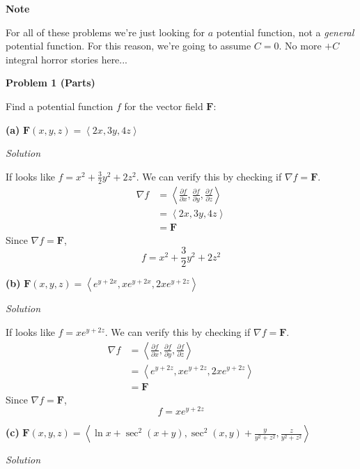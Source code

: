 \documentclass{article}
\newcommand{\lrp}[1]{\left( #1 \right)}
\newcommand{\lra}[1]{\left\langle #1 \right\rangle}
\newcommand{\F}[0]{\mathbf{F}}
\newcommand{\Solution}{\textit{Solution}}
\begin{document}
\textbf{Note}

For all of these problems we're just looking for $\textit{a}$ potential function, not a \textit{general} potential function. For this reason, we're going to assume $C=0$. No more $+C$ integral horror stories here...

{}\textbf{Problem 1 (Parts)}

Find a potential function $f$ for the vector field $\F$:

{}\textbf{(a)} $\F\lrp{x,y,z}=\lra{2x,3y,4z}$

\Solution

If looks like $f=x^2+\frac{3}{2}y^2+2z^2$. We can verify this by checking if $\nabla f = \F$.
\begin{align*}
      \nabla f &=\lra{\frac{\partial f}{\partial x}, \frac{\partial f}{\partial y}, \frac{\partial f}{\partial z}}\\
      &=\lra{2x, 3y, 4z}\\
      &=\F
\end{align*}
 Since $\nabla f = \F$,
 \begin{equation*}
     \boxed{f=x^2+\frac{3}{2}y^2+2z^2}
 \end{equation*}
{}\textbf{(b)} $\displaystyle\F(x,y,z)=\lra{e^{y+2x}, xe^{y+2x}, 2xe^{y+2z}}$

\Solution

If looks like $f = xe^{y+2z}$. We can verify this by checking if $\nabla f = \F$.
\begin{align*}
     \nabla f &=\lra{\frac{\partial f}{\partial x}, \frac{\partial f}{\partial y}, \frac{\partial f}{\partial z}}\\
     &=\lra{e^{y+2z}, xe^{y+2z}, 2xe^{y+2z}}\\
     &=\F
\end{align*}
Since $\nabla f = \F$,
\begin{equation*}
    \boxed{f = xe^{y+2z}}
\end{equation*}
{}\textbf{(c)} $\displaystyle\F(x,y,z)=\lra{\ln x+\sec^2(x+y),\sec^2(x,y)+\frac{y}{y^2+z^2},\frac{z}{y^2+z^2}}$

\Solution
\end{document}
